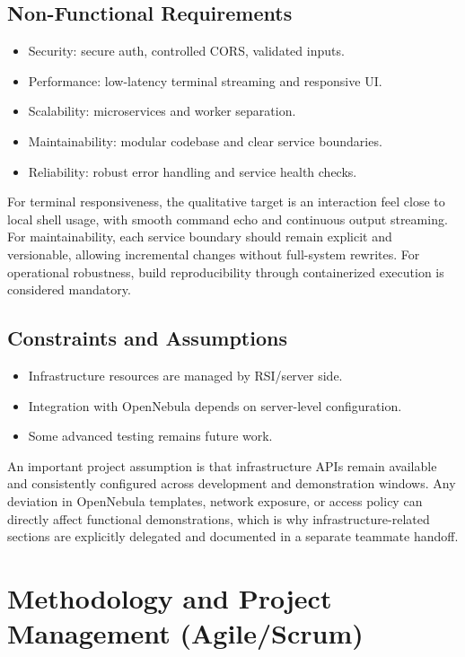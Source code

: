 \documentclass[12pt,a4paper]{report}
\begin{document}
\section{Non-Functional Requirements}
\begin{itemize}[leftmargin=*]
    \item Security: secure auth, controlled CORS, validated inputs.
    \item Performance: low-latency terminal streaming and responsive UI.
    \item Scalability: microservices and worker separation.
    \item Maintainability: modular codebase and clear service boundaries.
    \item Reliability: robust error handling and service health checks.
\end{itemize}

For terminal responsiveness, the qualitative target is an interaction feel close to local shell usage, with smooth command echo and continuous output streaming.
For maintainability, each service boundary should remain explicit and versionable, allowing incremental changes without full-system rewrites.
For operational robustness, build reproducibility through containerized execution is considered mandatory.

\section{Constraints and Assumptions}
\begin{itemize}[leftmargin=*]
    \item Infrastructure resources are managed by RSI/server side.
    \item Integration with OpenNebula depends on server-level configuration.
    \item Some advanced testing remains future work.
\end{itemize}

An important project assumption is that infrastructure APIs remain available and consistently configured across development and demonstration windows.
Any deviation in OpenNebula templates, network exposure, or access policy can directly affect functional demonstrations, which is why infrastructure-related sections are explicitly delegated and documented in a separate teammate handoff.

\chapter{Methodology and Project Management (Agile/Scrum)}
\end{document}
